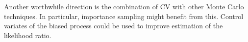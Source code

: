 Another worthwhile direction is the combination of \ac{CV} with other
Monte Carlo techniques.
In particular, importance sampling might benefit from this.
Control variates of the biased process could be used to improve
estimation of the likelihood ratio.

